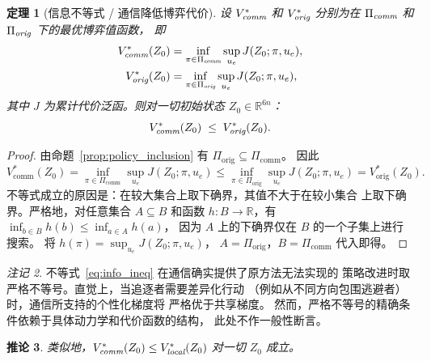 \documentclass[a4paper,11pt]{article}
\theoremstyle{plain}
\newtheorem{theorem}{定理}[section]
\newtheorem{corollary}[theorem]{推论}
\theoremstyle{definition}
\theoremstyle{remark}
\newtheorem{remark}[theorem]{注记}
\newcommand{\R}{\mathbb{R}}
\begin{document}
\begin{theorem}[信息不等式 / 通信降低博弈代价]\label{thm:info_ineq}
  设 $V^*_{\emph{comm}}$ 和 $V^*_{\emph{orig}}$ 分别为在
  $\Pi_{\emph{comm}}$ 和 $\Pi_{\emph{orig}}$ 下的最优博弈值函数，
  即
  \begin{align}
    V^*_{\emph{comm}}(Z_0) &= \inf_{\pi \in \Pi_{\emph{comm}}}
      \sup_{u_e} J(Z_0; \pi, u_e), \label{eq:V_comm_star}\\
    V^*_{\emph{orig}}(Z_0) &= \inf_{\pi \in \Pi_{\emph{orig}}}
      \sup_{u_e} J(Z_0; \pi, u_e), \label{eq:V_orig_star}
  \end{align}
  其中 $J$ 为累计代价泛函。则对一切初始状态 $Z_0 \in \R^{6n}$：
  \begin{equation}\label{eq:info_ineq}
    V^*_{\emph{comm}}(Z_0) \;\le\; V^*_{\emph{orig}}(Z_0).
  \end{equation}
\end{theorem}

\begin{proof}
  由命题~\ref{prop:policy_inclusion} 有
  $\Pi_{\text{orig}} \subseteq \Pi_{\text{comm}}$。
  因此
  \begin{equation}\label{eq:info_ineq_proof}
    V^*_{\text{comm}}(Z_0)
    = \inf_{\pi \in \Pi_{\text{comm}}} \sup_{u_e} J(Z_0; \pi, u_e)
    \le \inf_{\pi \in \Pi_{\text{orig}}} \sup_{u_e} J(Z_0; \pi, u_e)
    = V^*_{\text{orig}}(Z_0).
  \end{equation}
  不等式成立的原因是：在较大集合上取下确界，其值不大于在较小集合
  上取下确界。严格地，对任意集合 $A \subseteq B$ 和函数
  $h: B \to \R$，有 $\inf_{b\in B} h(b) \le \inf_{a\in A} h(a)$，
  因为 $A$ 上的下确界仅在 $B$ 的一个子集上进行搜索。
  将 $h(\pi) = \sup_{u_e} J(Z_0; \pi, u_e)$，
  $A = \Pi_{\text{orig}}$，$B = \Pi_{\text{comm}}$ 代入即得。
\end{proof}

\begin{remark}\label{rmk:info_ineq_strict}
  不等式~\eqref{eq:info_ineq} 在通信确实提供了原方法无法实现的
  策略改进时取严格不等号。直觉上，当追逐者需要差异化行动
  （例如从不同方向包围逃避者）时，通信所支持的个性化梯度将
  严格优于共享梯度。
  然而，严格不等号的精确条件依赖于具体动力学和代价函数的结构，
  此处不作一般性断言。
\end{remark}

\begin{corollary}\label{cor:local_ineq}
  类似地，$V^*_{\emph{comm}}(Z_0) \le V^*_{\emph{local}}(Z_0)$
  对一切 $Z_0$ 成立。
\end{corollary}
\end{document}
